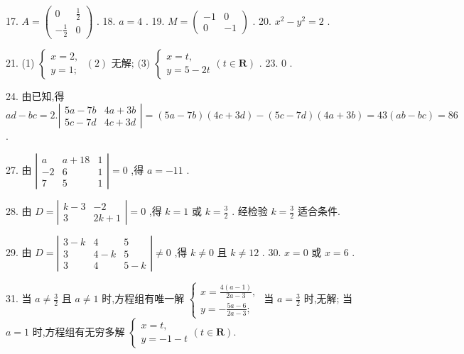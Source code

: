 \documentclass[10pt]{article}
\begin{document}
17. \(A = \left( \begin{matrix} 0 & \frac{1}{2} \\   - \frac{1}{2} & 0 \end{matrix}\right)\) . 18. \(a = 4\) . 19. \(M = \left( \begin{matrix}  - 1 & 0 \\  0 &  - 1 \end{matrix}\right)\) . 20. \({x}^{2} - {y}^{2} = 2\) .

21. (1) \(\left\{  {\begin{array}{l} x = 2, \\  y = 1; \end{array}\;\left( 2\right) \text{ 无解; (3) }\left\{  {\begin{array}{l} x = t, \\  y = 5 - {2t} \end{array}\left( {t \in  \mathbf{R}}\right) }\right. }\right.\) . 23. 0 .

24. 由已知,得 \({ad} - {bc} = 2.\left| \begin{matrix} {5a} - {7b} & {4a} + {3b} \\  {5c} - {7d} & {4c} + {3d} \end{matrix}\right|  = \left( {{5a} - {7b}}\right) \left( {{4c} + {3d}}\right)  - \left( {{5c} - {7d}}\right) \left( {{4a} + {3b}}\right)  = {43}\left( {{ab} - {bc}}\right)  = {86}\) .

27. 由 \(\left| \begin{matrix} a & a + {18} & 1 \\   - 2 & 6 & 1 \\  7 & 5 & 1 \end{matrix}\right|  = 0\) ,得 \(a =  - {11}\) .

28. 由 \(D = \left| \begin{matrix} k - 3 &  - 2 \\  3 & {2k} + 1 \end{matrix}\right|  = 0\) ,得 \(k = 1\) 或 \(k = \frac{3}{2}\) . 经检验 \(k = \frac{3}{2}\) 适合条件.

29. 由 \(D = \left| \begin{matrix} 3 - k & 4 & 5 \\  3 & 4 - k & 5 \\  3 & 4 & 5 - k \end{matrix}\right|  \neq  0\) ,得 \(k \neq  0\) 且 \(k \neq  {12}\) . 30. \(x = 0\) 或 \(x = 6\) .

31. 当 \(a \neq  \frac{3}{2}\) 且 \(a \neq  1\) 时,方程组有唯一解 \(\left\{  \begin{array}{l} x = \frac{4\left( {a - 1}\right) }{{2a} - 3}, \\  y =  - \frac{{5a} - 6}{{2a} - 3}; \end{array}\right.\) 当 \(a = \frac{3}{2}\) 时,无解; 当 \(a = 1\) 时,方程组有无穷多解 \(\left\{  {\begin{array}{l} x = t, \\  y =  - 1 - t \end{array}\left( {t \in  \mathbf{R}}\right) .}\right.\)
\end{document}
